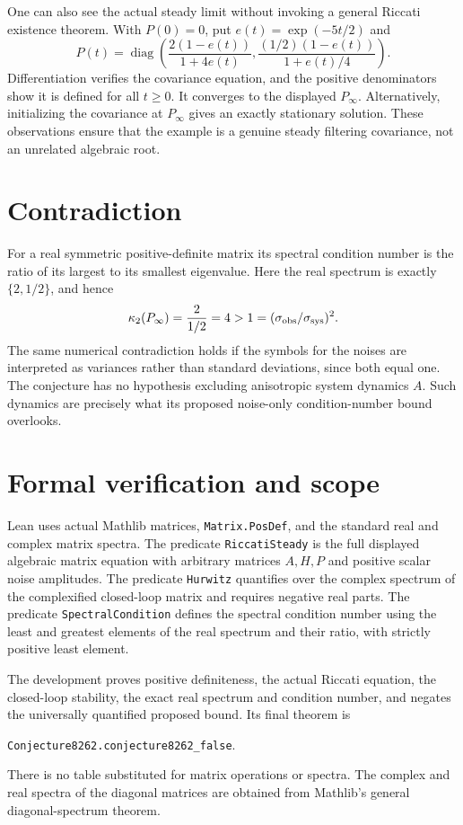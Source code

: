 \documentclass[11pt]{article}
\begin{document}
One can also see the actual steady limit without invoking a general
Riccati existence theorem. With $P(0)=0$, put $e(t)=\exp(-5t/2)$ and
\[
 P(t)=\operatorname{diag}\left(
       \frac{2(1-e(t))}{1+4e(t)},
       \frac{(1/2)(1-e(t))}{1+e(t)/4}\right).
\]
Differentiation verifies the covariance equation, and the positive
denominators show it is defined for all $t\geq0$. It converges to the
displayed $P_\infty$. Alternatively, initializing the covariance at
$P_\infty$ gives an exactly stationary solution. These observations
ensure that the example is a genuine steady filtering covariance,
not an unrelated algebraic root.

\section*{Contradiction}
For a real symmetric positive-definite matrix its spectral condition
number is the ratio of its largest to its smallest eigenvalue. Here
the real spectrum is exactly $\{2,1/2\}$, and hence
\[
 \kappa_2(P_\infty)=\frac{2}{1/2}=4
       >1=(\sigma_{\rm obs}/\sigma_{\rm sys})^2.
\]
The same numerical contradiction holds if the symbols for the noises
are interpreted as variances rather than standard deviations, since
both equal one. The conjecture has no hypothesis excluding anisotropic
system dynamics $A$. Such dynamics are precisely what its proposed
noise-only condition-number bound overlooks.

\section*{Formal verification and scope}
Lean uses actual Mathlib matrices, \texttt{Matrix.PosDef}, and the
standard real and complex matrix spectra. The predicate
\texttt{RiccatiSteady} is the full displayed algebraic matrix equation
with arbitrary matrices $A,H,P$ and positive scalar noise amplitudes.
The predicate \texttt{Hurwitz} quantifies over the complex spectrum
of the complexified closed-loop matrix and requires negative real parts.
The predicate \texttt{SpectralCondition} defines the spectral condition
number using the least and greatest elements of the real spectrum and
their ratio, with strictly positive least element.

The development proves positive definiteness, the actual Riccati
equation, the closed-loop stability, the exact real spectrum and condition
number, and negates the universally quantified proposed bound. Its
final theorem is
\begin{center}\texttt{Conjecture8262.conjecture8262\_false}.\end{center}
There is no table substituted for matrix operations or spectra. The
complex and real spectra of the diagonal matrices are obtained from
Mathlib's general diagonal-spectrum theorem.
\end{document}
